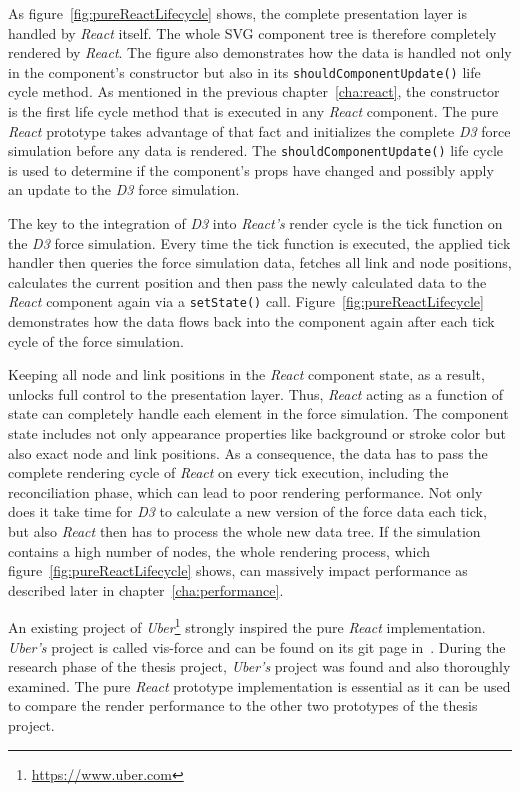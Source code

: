 As figure~\ref{fig:pureReactLifecycle} shows, the complete presentation layer is handled by \emph{React} itself. The whole SVG component tree is therefore completely rendered by \emph{React}. The figure also demonstrates how the data is handled not only in the component's constructor but also in its \texttt{shouldComponentUpdate()} life cycle method. As mentioned in the previous chapter~\ref{cha:react}, the constructor is the first life cycle method that is executed in any \emph{React} component. The pure \emph{React} prototype takes advantage of that fact and initializes the complete \emph{D3} force simulation before any data is rendered. The \texttt{shouldComponentUpdate()} life cycle is used to determine if the component's props have changed and possibly apply an update to the \emph{D3} force simulation.

The key to the integration of \emph{D3} into \emph{React's} render cycle is the tick function on the \emph{D3} force simulation. Every time the tick function is executed, the applied tick handler then queries the force simulation data, fetches all link and node positions, calculates the current position and then pass the newly calculated data to the \emph{React} component again via a \texttt{setState()} call. Figure~\ref{fig:pureReactLifecycle} demonstrates how the data flows back into the component again after each tick cycle of the force simulation.

Keeping all node and link positions in the \emph{React} component state, as a result, unlocks full control to the presentation layer. Thus, \emph{React} acting as a function of state can completely handle each element in the force simulation. The component state includes not only appearance properties like background or stroke color but also exact node and link positions. As a consequence, the data has to pass the complete rendering cycle of \emph{React} on every tick execution, including the reconciliation phase, which can lead to poor rendering performance. Not only does it take time for \emph{D3} to calculate a new version of the force data each tick, but also \emph{React} then has to process the whole new data tree. If the simulation contains a high number of nodes, the whole rendering process, which figure~\ref{fig:pureReactLifecycle} shows, can massively impact performance as described later in chapter~\ref{cha:performance}.

An existing project of \emph{Uber}\footnote{\url{https://www.uber.com}} strongly inspired the pure \emph{React} implementation. \emph{Uber's} project is called vis-force and can be found on its git page in~\cite{UberVisForce}. During the research phase of the thesis project, \emph{Uber's} project was found and also thoroughly examined. The pure \emph{React} prototype implementation is essential as it can be used to compare the render performance to the other two prototypes of the thesis project.


